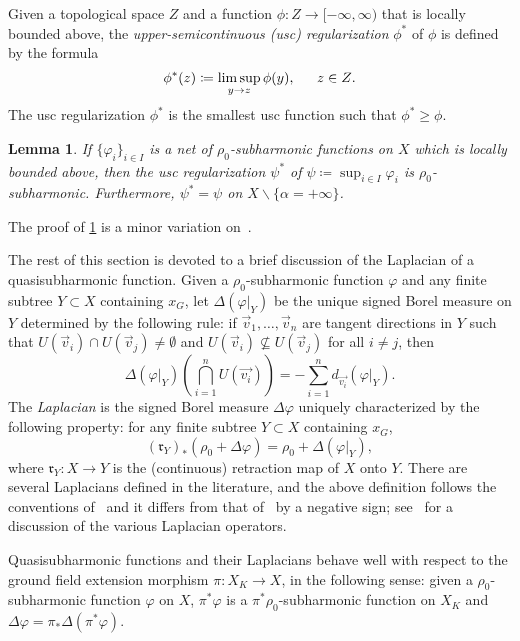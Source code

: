 \documentclass[10pt,reqno]{amsart}
\theoremstyle{plain}
\newtheorem{lemma}[theorem]{Lemma}
\theoremstyle{definition}
\numberwithin{equation}{section}
\begin{document}
Given a topological space $Z$ and a function $\phi \colon Z \to [-\infty,\infty)$ that is locally bounded above, the \emph{upper-semicontinuous (usc) regularization} $\phi^*$ of $\phi$ is defined by the formula
$$
\phi^*(z) \coloneqq \limsup_{y \to z} \phi(y), \textrm{\hspace{12pt} $z \in Z$.}
$$
The usc regularization $\phi^*$ is the smallest usc function such that $\phi^* \geq \phi$. 

\begin{lemma}\label{lemma:baker_rumely}
If $\{ \varphi_i \}_{i \in I}$ is a net of $\rho_0$-subharmonic functions on $X$ which is locally bounded above, then the usc regularization $\psi^*$ of $\psi \coloneqq \sup_{i \in I} \varphi_i$ is $\rho_0$-subharmonic. Furthermore, $\psi^* = \psi$ on $X \backslash \{ \alpha = +\infty \}$.
\end{lemma}

The proof of \cref{lemma:baker_rumely} is a minor variation on~\cite[Proposition 8.23(E)]{baker-rumely}.

The rest of this section is devoted to a brief discussion of the Laplacian of a quasisubharmonic function. Given a $\rho_0$-subharmonic function $\varphi$ and any finite subtree $Y \subset X$ containing $x_G$, let $\Delta (\varphi|_{Y})$ be the unique signed Borel measure on $Y$ determined by the following rule: 
if $\vec{v}_1,\ldots,\vec{v}_n$ are tangent directions in $Y$ such that $U(\vec{v}_i) \cap U(\vec{v}_j) \not= \emptyset$ and $U(\vec{v}_i) \not\subseteq U(\vec{v}_j)$ for all $i \not= j$, then
$$
\Delta (\varphi|_Y) \left( \bigcap_{i=1}^n U(\vec{v_i}) \right) = -\sum_{i=1}^n d_{\vec{v_i}} \left( \varphi|_Y \right).
$$
The \emph{Laplacian} is the signed Borel measure $\Delta \varphi$ uniquely characterized by the following property: for any finite subtree $Y \subset X$ containing $x_G$,
$$
(\mathfrak{r}_Y)_*(\rho_0 + \Delta \varphi) = \rho_0 + \Delta \left( \varphi|_Y \right),
$$
where $\mathfrak{r}_Y \colon X \to Y$ is the (continuous) retraction map of $X$ onto $Y$.
There are several Laplacians defined in the literature, and the above definition follows the conventions of~\cite{favre-jonsson,dynberko} and it differs from that of~\cite{baker-rumely} by a negative sign; see~\cite[\S 5.8]{baker-rumely} for a discussion of the various Laplacian operators.

Quasisubharmonic functions and their Laplacians behave well with respect to the ground field extension morphism $\pi \colon X_K \to X$, in the following sense: given a $\rho_0$-subharmonic function $\varphi$ on $X$, $\pi^* \varphi$ is a $\pi^*\rho_0$-subharmonic function on $X_K$ and $\Delta \varphi = \pi_* \Delta (\pi^* \varphi)$.
\end{document}
